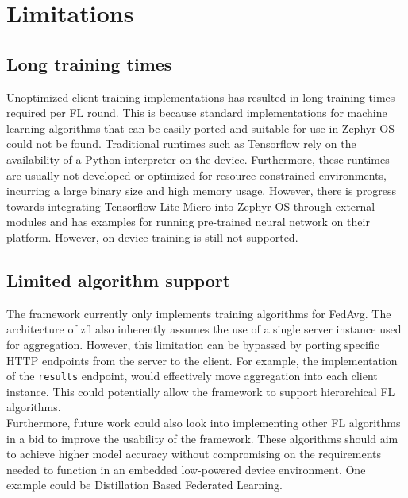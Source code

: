 \documentclass[12pt]{article}
\begin{document}
\section{Limitations}
\subsection{Long training times}
Unoptimized client training implementations has resulted in long training times required per FL
round. This is because standard implementations for machine learning
algorithms that can be easily ported and suitable for use in Zephyr OS could not be found.
Traditional runtimes such as Tensorflow\cite{tensorflow2015-whitepaper} rely on the availability of a Python interpreter on
the device. Furthermore, these runtimes are usually not developed or optimized for resource
constrained environments, incurring a large binary size and high memory usage. However, there is
progress towards integrating Tensorflow Lite Micro into Zephyr OS through external modules
and has examples for running pre-trained neural network on their platform. However, on-device
training is still not supported.

\subsection{Limited algorithm support}
The framework currently only implements training algorithms for FedAvg. The architecture of zfl also
inherently assumes the use of a single server instance used for aggregation. However, this
limitation can be bypassed by porting specific HTTP endpoints from the server to the client. For
example, the implementation of the \verb|results| endpoint, would effectively move aggregation into
each client instance. This could potentially allow the framework to support hierarchical FL
algorithms\cite{rana_2023_hierarchical}.\\

Furthermore, future work could also look into implementing other FL algorithms in a bid to improve
the usability of the framework. These algorithms should aim to achieve higher model accuracy without
compromising on the requirements needed to function in an embedded low-powered device environment.
One example could be Distillation Based Federated Learning\cite{liu2022efficient}.

\pagebreak


\end{document}
